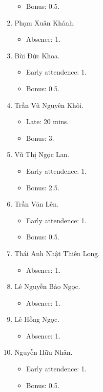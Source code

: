 \documentclass{article}
\begin{document}
\begin{enumerate}
\begin{itemize}
		\item Bonus: 0.5.
	\end{itemize}
	\item {\sc Phạm Xuân Khánh.}
	\begin{itemize}
		\item Absence: 1.
	\end{itemize}
	\item {\sc Bùi Đức Khoa.}
	\begin{itemize}
		\item Early attendence: 1.
		\item Bonus: 0.5.
	\end{itemize}
	\item {\sc Trần Vũ Nguyên Khôi.}
	\begin{itemize}
		\item Late: 20 mins.
		\item Bonus: 3.
	\end{itemize}
	\item {\sc Vũ Thị Ngọc Lan.}
	\begin{itemize}
		\item Early attendence: 1.
		\item Bonus: 2.5.
	\end{itemize}
	\item {\sc Trần Văn Lên.}
	\begin{itemize}
		\item Early attendence: 1.
		\item Bonus: 0.5.
	\end{itemize}
	\item {\sc Thái Anh Nhật Thiên Long.}
	\begin{itemize}
		\item Absence: 1.
	\end{itemize}
	\item {\sc Lê Nguyễn Bảo Ngọc.}
	\begin{itemize}
		\item Absence: 1.
	\end{itemize}
	\item {\sc Lê Hồng Ngọc.}
	\begin{itemize}
		\item Absence: 1.
	\end{itemize}
	\item {\sc Nguyễn Hữu Nhân.}
	\begin{itemize}
		\item Early attendence: 1.
		\item Bonus: 0.5.
	\end{itemize}

\end{enumerate}
\end{document}
